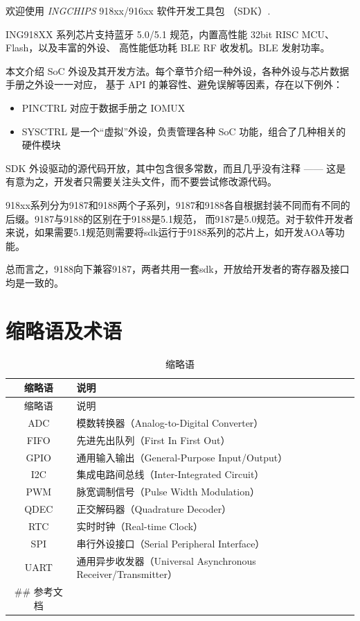 \documentclass[
  12pt,
]{book}
\providecommand{\tightlist}{%
  \setlength{\itemsep}{0pt}\setlength{\parskip}{0pt}}
\begin{document}
欢迎使用 \emph{INGCHIPS} 918xx/916xx 软件开发工具包 （SDK）.

ING918XX 系列芯片支持蓝牙 5.0/5.1 规范，内置高性能 32bit RISC MCU、Flash，以及丰富的外设、
高性能低功耗 BLE RF 收发机。BLE 发射功率。

本文介绍 SoC 外设及其开发方法。每个章节介绍一种外设，各种外设与芯片数据手册之外设一一对应，
基于 API 的兼容性、避免误解等因素，存在以下例外：

\begin{itemize}
\tightlist
\item
  PINCTRL 对应于数据手册之 IOMUX
\item
  SYSCTRL 是一个``虚拟''外设，负责管理各种 SoC 功能，组合了几种相关的硬件模块
\end{itemize}

SDK 外设驱动的源代码开放，其中包含很多常数，而且几乎没有注释 ------ 这是有意为之，开发者只需要关注头文件，而不要尝试修改源代码。

918xx系列分为9187和9188两个子系列，9187和9188各自根据封装不同而有不同的后缀。9187与9188的区别在于9188是5.1规范，
而9187是5.0规范。对于软件开发者来说，如果需要5.1规范则需要将sdk运行于9188系列的芯片上，如开发AOA等功能。

总而言之，9188向下兼容9187，两者共用一套sdk，开放给开发者的寄存器及接口均是一致的。

\hypertarget{ux7f29ux7565ux8bedux53caux672fux8bed}{%
\section{缩略语及术语}\label{ux7f29ux7565ux8bedux53caux672fux8bed}}

\begin{longtable}[]{@{}cl@{}}
\caption{\label{tab:ch0-abbreviations} 缩略语}\tabularnewline
\toprule
缩略语 & 说明\tabularnewline
\midrule
\endfirsthead
\toprule
缩略语 & 说明\tabularnewline
\midrule
\endhead
ADC & 模数转换器（Analog-to-Digital Converter）\tabularnewline
FIFO & 先进先出队列（First In First Out）\tabularnewline
GPIO & 通用输入输出（General-Purpose Input/Output）\tabularnewline
I2C & 集成电路间总线（Inter-Integrated Circuit）\tabularnewline
PWM & 脉宽调制信号（Pulse Width Modulation）\tabularnewline
QDEC & 正交解码器（Quadrature Decoder）\tabularnewline
RTC & 实时时钟（Real-time Clock）\tabularnewline
SPI & 串行外设接口（Serial Peripheral Interface）\tabularnewline
UART & 通用异步收发器（Universal Asynchronous Receiver/Transmitter）\tabularnewline
\#\# 参考文档 &\tabularnewline
\bottomrule
\end{longtable}
\end{document}
